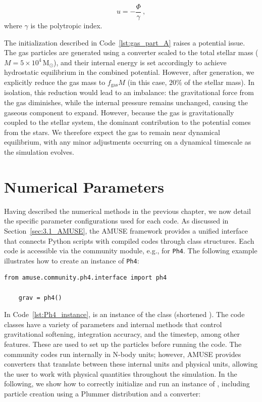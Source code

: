 \begin{equation}
	u = - \frac{\Phi}{\gamma}~,
\end{equation}
where $\gamma$ is the polytropic index. 

The initialization described in Code~\ref{lst:gas_part_A} raises a potential issue. The gas particles are generated using a converter scaled to the total stellar mass ($M = 5\times10^4\,\mathrm{M_\odot}$), and their internal energy is set accordingly to achieve hydrostatic equilibrium in the combined potential. However, after generation, we explicitly reduce the gas mass to $f_{\mathrm{gas}} M$ (in this case, $20\%$ of the stellar mass). In isolation, this reduction would lead to an imbalance: the gravitational force from the gas diminishes, while the internal pressure remains unchanged, causing the gaseous component to expand. However, because the gas is gravitationally coupled to the stellar system, the dominant contribution to the potential comes from the stars. We therefore expect the gas to remain near dynamical equilibrium, with any minor adjustments occurring on a dynamical timescale as the simulation evolves.

\section{Numerical Parameters}
\label{sec:4.3_Numerical_parameters}

Having described the numerical methods in the previous chapter, we now detail the specific parameter configurations used for each code. As discussed in Section~\ref{sec:3.1_AMUSE}, the AMUSE framework provides a unified interface that connects Python scripts with compiled codes through class structures. Each code is accessible via the community module, e.g.,  for \texttt{Ph4}. The following example illustrates how to create an instance of \texttt{Ph4}:

\begin{lstlisting}[caption=Instance creation for \texttt{Ph4}, label=lst:Ph4_instance]
	from amuse.community.ph4.interface import ph4
	
	grav = ph4()
\end{lstlisting}

In Code~\ref{lst:Ph4_instance},  is an instance of the class  (shortened ). The code classes have a variety of parameters and internal methods that control gravitational softening, integration accuracy, and the timestep, among other features. These are used to set up the particles before running the code. The community codes run internally in N-body units; however, AMUSE provides converters that translate between these internal units and physical units, allowing the user to work with physical quantities throughout the simulation. In the following, we show how to correctly initialize and run an instance of , including particle creation using a Plummer distribution and a converter:


